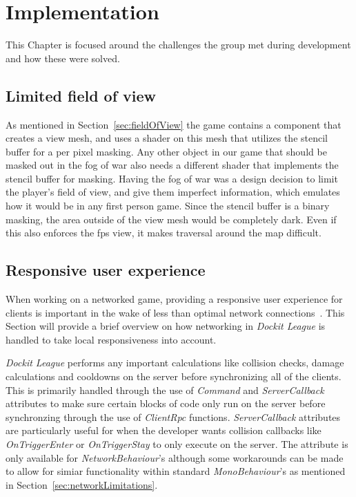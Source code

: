 \chapter{Implementation}
\label{chap:implementation}
This Chapter is focused around the challenges the group met during development and how these were solved.  

\section{Limited field of view}
As mentioned in Section~\ref{sec:fieldOfView} the game contains a component that creates a view mesh, and uses a shader on this mesh that utilizes the stencil buffer for a per pixel masking. Any other object in our game that should be masked out in the fog of war also needs a different shader that implements the stencil buffer for masking. Having the fog of war was a design decision to limit the player's field of view, and give them imperfect information, which emulates how it would be in any first person game.\cite{gameDesignTheory}
Since the stencil buffer is a binary masking, the area outside of the view mesh would be completely dark. Even if this also enforces the fps view, it makes traversal around the map difficult.


\section{Responsive user experience}
When working on a networked game, providing a responsive user experience for clients is important in the wake of less than optimal network connections~\cite{bernier2001latency}. This Section will provide a brief overview on how networking in \emph{Dockit League} is handled to take local responsiveness into account. 

\emph{Dockit League} performs any important calculations like collision checks, damage calculations and cooldowns on the server before synchronizing all of the clients. This is primarily handled through the use of \emph{Command} and \emph{ServerCallback} attributes to make sure certain blocks of code only run on the server before synchronzing through the use of \emph{ClientRpc} functions. \emph{ServerCallback} attributes are particularly useful for when the developer wants collision callbacks like \emph{OnTriggerEnter} or \emph{OnTriggerStay} to only execute on the server. The attribute is only available for \emph{NetworkBehaviour}'s although some workarounds can be made to allow for simiar functionality within standard \emph{MonoBehaviour}'s as mentioned in Section~\ref{sec:networkLimitations}.  

